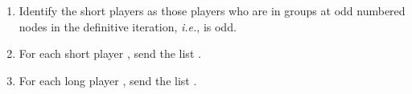 \documentclass[12pt]{article}
\theoremstyle{definition}
\newcommand{\ie}{\emph{i.e.}}
\newcommand{\recursiveShares}{\emph{RecursiveShares}\xspace}
\begin{document}
\begin{algorithm}
{\begin{enumerate}
\begin{itemize}
 Otherwise,  random element of 
\item Create shares of  by calling \recursiveShares.
\item Create -out-of- Shamir shares of each of the
leaf values of the shares created by \recursiveShares (one for each player 
in the group corresponding to the leaf.)
\item Create authentication data.
\item For each , for each player , 's (full) input  for 
round   consists of positional data, Shamir shares of recursive shares of 
 and  corresponding to node , and authentication data.
Partial input  consists of 
all of the above except the authentication tags for sending messages to your 
children (in the down-stage).
\end{itemize}
\item Identify the short players as those players  who are in groups at odd 
numbered nodes in the definitive iteration, \ie,  is odd.
\item For each short player , send  the list 
.
\item For each long player , send  the list 
.
\end{enumerate}}
\end{algorithm}
\end{document}
